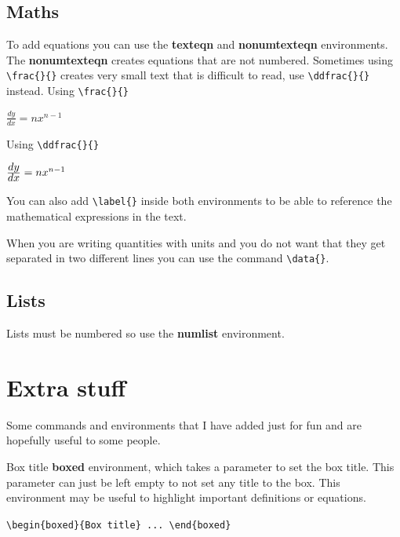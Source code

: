 \documentclass[headers1]{MSEHouseStyle}
\begin{document}
\newpage
\subsection{Maths}
\noindent
To add equations you can use the \textbf{texteqn} and \textbf{nonumtexteqn} environments. The \textbf{nonumtexteqn} creates equations that are not numbered. Sometimes using \verb|\frac{}{}| creates very small text that is difficult to read, use \verb|\ddfrac{}{}| instead. Using \verb|\frac{}{}|
\begin{texteqn}
$\frac{dy}{dx} = nx^{n-1}$
\label{eqn:1}
\end{texteqn}
Using \verb|\ddfrac{}{}|
\begin{texteqn}
$\frac{\displaystyle dy}{\displaystyle dx} = nx^{n-1}$
\label{eqn:2}
\end{texteqn}
You can also add \verb|\label{}| inside both environments to be able to reference the mathematical expressions in the text. \par
When you are writing quantities with units and you do not want that they get separated in two different lines you can use the command \verb|\data{}|.

\subsection{Lists}
\noindent
Lists must be numbered so use the \textbf{numlist} environment.

\section{Extra stuff}
\noindent
Some commands and environments that I have added just for fun and are hopefully useful to some people.

\begin{boxed}{Box title}
\textbf{boxed} environment, which takes a parameter to set the box title. This parameter can just be left empty to not set any title to the box. This environment may be useful to highlight important definitions or equations. \par
    \hfill\verb|\begin{boxed}{Box title} ... \end{boxed}|
\end{boxed}
\end{document}
